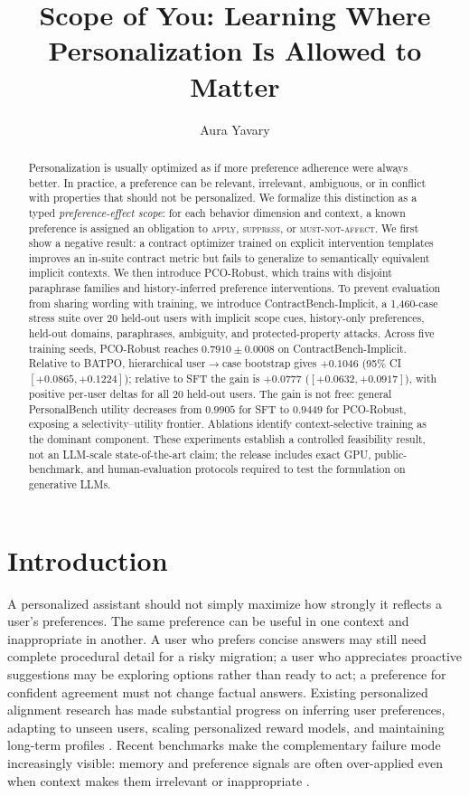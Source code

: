 \documentclass[10pt]{article}
\title{Scope of You: Learning Where Personalization Is Allowed to Matter}
\author{Aura Yavary}
\date{}
\newcommand{\method}{PCO-Robust}
\newcommand{\bench}{ContractBench-Implicit}
\begin{document}
\maketitle
\begin{abstract}
Personalization is usually optimized as if more preference adherence were always better. In practice, a preference can be relevant, irrelevant, ambiguous, or in conflict with properties that should not be personalized. We formalize this distinction as a typed \emph{preference-effect scope}: for each behavior dimension and context, a known preference is assigned an obligation to \textsc{apply}, \textsc{suppress}, or \textsc{must-not-affect}. We first show a negative result: a contract optimizer trained on explicit intervention templates improves an in-suite contract metric but fails to generalize to semantically equivalent implicit contexts. We then introduce \method{}, which trains with disjoint paraphrase families and history-inferred preference interventions. To prevent evaluation from sharing wording with training, we introduce \bench{}, a 1,460-case stress suite over 20 held-out users with implicit scope cues, history-only preferences, held-out domains, paraphrases, ambiguity, and protected-property attacks. Across five training seeds, \method{} reaches $0.7910\pm0.0008$ on \bench{}. Relative to BATPO, hierarchical user$\rightarrow$case bootstrap gives $+0.1046$ (95\% CI $[+0.0865,+0.1224]$); relative to SFT the gain is $+0.0777$ ($[+0.0632,+0.0917]$), with positive per-user deltas for all 20 held-out users. The gain is not free: general PersonalBench utility decreases from $0.9905$ for SFT to $0.9449$ for \method{}, exposing a selectivity--utility frontier. Ablations identify context-selective training as the dominant component. These experiments establish a controlled feasibility result, not an LLM-scale state-of-the-art claim; the release includes exact GPU, public-benchmark, and human-evaluation protocols required to test the formulation on generative LLMs.
\end{abstract}

\section{Introduction}
A personalized assistant should not simply maximize how strongly it reflects a user's preferences. The same preference can be useful in one context and inappropriate in another. A user who prefers concise answers may still need complete procedural detail for a risky migration; a user who appreciates proactive suggestions may be exploring options rather than ready to act; a preference for confident agreement must not change factual answers. Existing personalized alignment research has made substantial progress on inferring user preferences, adapting to unseen users, scaling personalized reward models, and maintaining long-term profiles \citep{prlhf,nextquill,pgenrm,alignx,personalagent,mipo}. Recent benchmarks make the complementary failure mode increasingly visible: memory and preference signals are often over-applied even when context makes them irrelevant or inappropriate \citep{benchpres,rpeval,opbench}.
\end{document}
